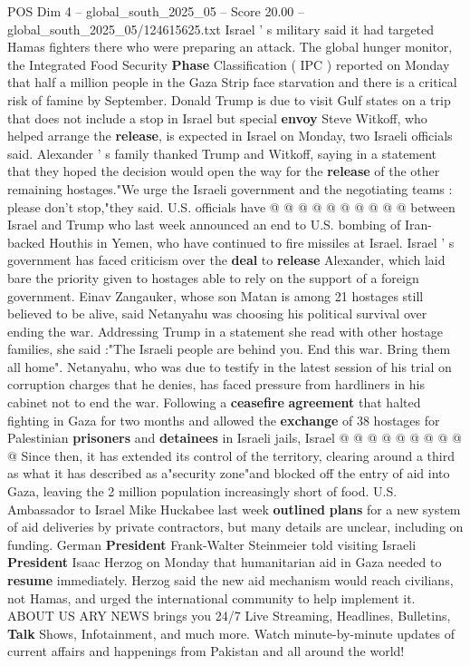 \begin{textsample}{POS Dim 4 – global\_south\_2025\_05 – Score 20.00 – global\_south\_2025\_05/124615625.txt}
Israel ' s military said it had targeted Hamas fighters there who were preparing an attack.
The global hunger monitor, the Integrated Food Security \textbf{Phase} Classification ( IPC ) reported on Monday that half a million people in the Gaza Strip face starvation and there is a critical risk of famine by September.
Donald Trump is due to visit Gulf states on a trip that does not include a stop in Israel but special \textbf{envoy} Steve Witkoff, who helped arrange the \textbf{release}, is expected in Israel on Monday, two Israeli officials said.
Alexander ' s family thanked Trump and Witkoff, saying in a statement that they hoped the decision would open the way for the \textbf{release} of the other remaining hostages."We urge the Israeli government and the negotiating teams : please don't stop,"they said.
U.S. officials have @ @ @ @ @ @ @ @ @ @ between Israel and Trump who last week announced an end to U.S. bombing of Iran-backed Houthis in Yemen, who have continued to fire missiles at Israel.
Israel ' s government has faced criticism over the \textbf{deal} to \textbf{release} Alexander, which laid bare the priority given to hostages able to rely on the support of a foreign government.
Einav Zangauker, whose son Matan is among 21 hostages still believed to be alive, said Netanyahu was choosing his political survival over ending the war.
Addressing Trump in a statement she read with other hostage families, she said :"The Israeli people are behind you.
End this war.
Bring them all home".
Netanyahu, who was due to testify in the latest session of his trial on corruption charges that he denies, has faced pressure from hardliners in his cabinet not to end the war.
Following a \textbf{ceasefire} \textbf{agreement} that halted fighting in Gaza for two months and allowed the \textbf{exchange} of 38 hostages for Palestinian \textbf{prisoners} and \textbf{detainees} in Israeli jails, Israel @ @ @ @ @ @ @ @ @ @ Since then, it has extended its control of the territory, clearing around a third as what it has described as a"security zone"and blocked off the entry of aid into Gaza, leaving the 2 million population increasingly short of food.
U.S.
Ambassador to Israel Mike Huckabee last week \textbf{outlined} \textbf{plans} for a new system of aid deliveries by private contractors, but many details are unclear, including on funding.
German \textbf{President} Frank-Walter Steinmeier told visiting Israeli \textbf{President} Isaac Herzog on Monday that humanitarian aid in Gaza needed to \textbf{resume} immediately.
Herzog said the new aid mechanism would reach civilians, not Hamas, and urged the international community to help implement it.
ABOUT US ARY NEWS brings you 24/7 Live Streaming, Headlines, Bulletins, \textbf{Talk} Shows, Infotainment, and much more.
Watch minute-by-minute updates of current affairs and happenings from Pakistan and all around the world!

\end{textsample}
